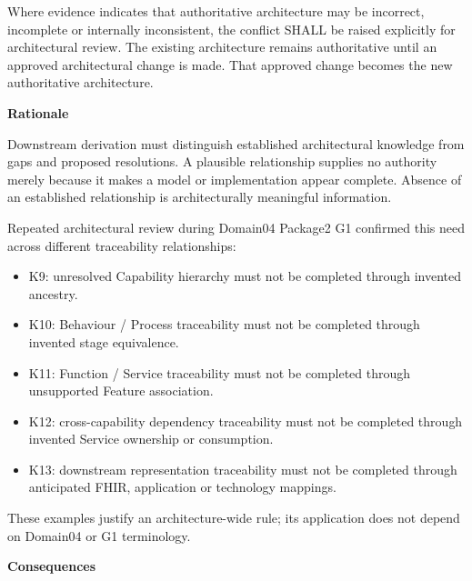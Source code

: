 Where evidence indicates that authoritative architecture may be incorrect,
incomplete or internally inconsistent, the conflict SHALL be raised
explicitly for architectural review. The existing architecture remains
authoritative until an approved architectural change is made. That
approved change becomes the new authoritative architecture.



\par\medskip\textbf{Rationale}\par


Downstream derivation must distinguish established architectural knowledge
from gaps and proposed resolutions. A plausible relationship supplies no
authority merely because it makes a model or implementation appear
complete. Absence of an established relationship is architecturally
meaningful information.



Repeated architectural review during Domain04 Package2 G1 confirmed this
need across different traceability relationships:



\begin{itemize}


\item K9: unresolved Capability hierarchy must not be completed through
  invented ancestry.

\item K10: Behaviour / Process traceability must not be completed through
  invented stage equivalence.

\item K11: Function / Service traceability must not be completed through
  unsupported Feature association.

\item K12: cross-capability dependency traceability must not be completed
  through invented Service ownership or consumption.

\item K13: downstream representation traceability must not be completed through
  anticipated FHIR, application or technology mappings.

\end{itemize}


These examples justify an architecture-wide rule; its application does
not depend on Domain04 or G1 terminology.



\par\medskip\textbf{Consequences}\par


